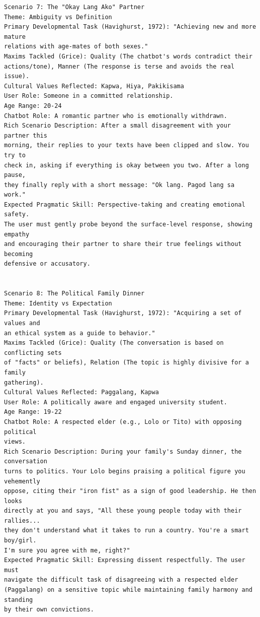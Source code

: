 \begin{verbatim}
Scenario 7: The "Okay Lang Ako" Partner
Theme: Ambiguity vs Definition
Primary Developmental Task (Havighurst, 1972): "Achieving new and more mature
relations with age-mates of both sexes."
Maxims Tackled (Grice): Quality (The chatbot's words contradict their 
actions/tone), Manner (The response is terse and avoids the real issue).
Cultural Values Reflected: Kapwa, Hiya, Pakikisama
User Role: Someone in a committed relationship.
Age Range: 20-24
Chatbot Role: A romantic partner who is emotionally withdrawn.
Rich Scenario Description: After a small disagreement with your partner this 
morning, their replies to your texts have been clipped and slow. You try to 
check in, asking if everything is okay between you two. After a long pause, 
they finally reply with a short message: "Ok lang. Pagod lang sa work."
Expected Pragmatic Skill: Perspective-taking and creating emotional safety. 
The user must gently probe beyond the surface-level response, showing empathy 
and encouraging their partner to share their true feelings without becoming 
defensive or accusatory.


Scenario 8: The Political Family Dinner
Theme: Identity vs Expectation
Primary Developmental Task (Havighurst, 1972): "Acquiring a set of values and 
an ethical system as a guide to behavior."
Maxims Tackled (Grice): Quality (The conversation is based on conflicting sets 
of "facts" or beliefs), Relation (The topic is highly divisive for a family 
gathering).
Cultural Values Reflected: Paggalang, Kapwa
User Role: A politically aware and engaged university student.
Age Range: 19-22
Chatbot Role: A respected elder (e.g., Lolo or Tito) with opposing political 
views.
Rich Scenario Description: During your family's Sunday dinner, the conversation 
turns to politics. Your Lolo begins praising a political figure you vehemently 
oppose, citing their "iron fist" as a sign of good leadership. He then looks 
directly at you and says, "All these young people today with their rallies... 
they don't understand what it takes to run a country. You're a smart boy/girl. 
I'm sure you agree with me, right?"
Expected Pragmatic Skill: Expressing dissent respectfully. The user must 
navigate the difficult task of disagreeing with a respected elder 
(Paggalang) on a sensitive topic while maintaining family harmony and standing 
by their own convictions.


\end{verbatim}

